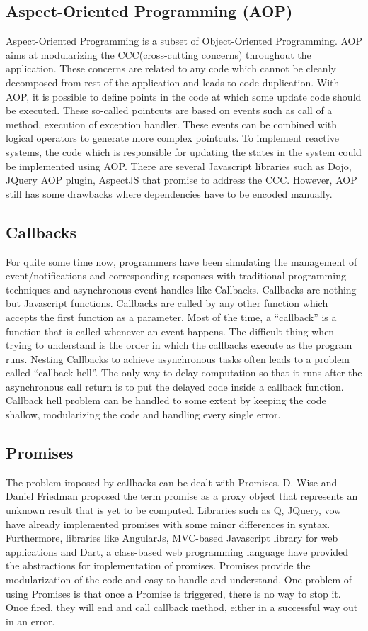 \subsection{Aspect-Oriented Programming (AOP)}
Aspect-Oriented Programming is a subset of Object-Oriented Programming. 
AOP aims at modularizing the CCC(cross-cutting concerns) throughout the application. 
These concerns are related to any code which cannot be cleanly decomposed from rest of the application and leads to code duplication. 
With AOP, it is possible to define points in the code at which some update code should be executed. 
These so-called pointcuts are based on events such as call of a method, execution of exception handler. 
These events can be combined with logical operators to generate more complex pointcuts. 
To implement reactive systems, the code which is responsible for updating the states in the system could be implemented using AOP. 
There are several Javascript libraries such as Dojo, JQuery AOP plugin, AspectJS that promise to address the CCC. 
However, AOP still has some drawbacks where dependencies have to be encoded manually.
\subsection{Callbacks}
For quite some time now, programmers have been simulating the management of event/notifications and corresponding responses with traditional programming techniques and asynchronous event handles like Callbacks. 
Callbacks are nothing but Javascript functions. 
Callbacks are called by any other function which accepts the first function as a parameter. 
Most of the time, a ``callback'' is a function that is called whenever an event happens. 
The difficult thing when trying to understand is the order in which the callbacks execute as the program runs. 
Nesting Callbacks to achieve asynchronous tasks often leads to a problem called ``callback hell''\cite{callbackHell}. 
The only way to delay computation so that it runs after the asynchronous call return is to put the delayed code inside a callback function.
Callback hell problem can be handled to some extent by keeping the code shallow, modularizing the code and handling every single error. 

\subsection{Promises}
The problem imposed by callbacks can be dealt with Promises. D. Wise and Daniel Friedman\cite{promiseKeyword} proposed the term promise as a proxy object that represents an unknown result that is yet to be computed. 
Libraries such as Q, JQuery, vow have already implemented promises with some minor differences in syntax.
Furthermore, libraries like AngularJs\cite{angularjs}, MVC-based Javascript library for web applications and Dart, a class-based web programming language have provided the abstractions for implementation of promises. 
Promises provide the modularization of the code and easy to handle and understand. 
One problem of using Promises is that once a Promise is triggered, there is no way to stop it. 
Once fired, they will end and call callback method, either in a successful way out in an error.


